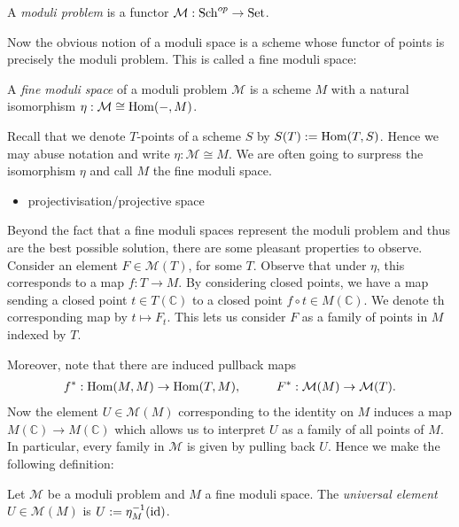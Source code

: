\documentclass[12pt]{ociamthesis}  %
\begin{document}
\begin{definition}
  A \emph{moduli problem} is a functor $\mathcal M:\operatorname{Sch}^{op}\to\operatorname{Set}$.
\end{definition}

Now the obvious notion of a moduli space is a scheme whose functor
of points is precisely the moduli problem. This is called a fine
moduli space:

\begin{definition}
  A \emph{fine moduli space} of a moduli problem $\mathcal M$
  is a scheme $M$ with a natural isomorphism
  $\eta : \mathcal M \cong \operatorname{Hom}(-,M)$.
\end{definition}

Recall that we denote $T$-points of a scheme $S$ by
$S(T) := \operatorname{Hom}(T,S)$. Hence we may abuse notation and write
$\eta : \mathcal M \cong M$. We are often going to surpress the
isomorphism $\eta$ and call $M$ the fine moduli space.

\begin{example}
  \begin{itemize}
    \item projectivisation/projective space \missingexample
  \end{itemize}
\end{example}

Beyond the fact that a fine moduli spaces represent the moduli
problem and thus are the best possible solution, there are some
pleasant properties to observe.
Consider an element $F\in\mathcal M(T)$, for some $T$. Observe that
under $\eta$, this corresponds to a map $f:T\to M$. By considering
closed points, we have a map sending a closed point $t\in T(\mathbb C)$
to a closed point $f\circ t\in M(\mathbb C)$. We denote th corresponding
map by $t \mapsto F_t$. This lets us consider $F$ as a family of
points in $M$ indexed by $T$.

Moreover, note that there are induced
pullback maps
\begin{align*}
  f^* : \operatorname{Hom}(M,M)\to\operatorname{Hom}(T,M), \hspace{1cm}
  F^* : \mathcal M(M)\to \mathcal M(T).
\end{align*}
Now the element $U\in\mathcal M(M)$ corresponding to the identity on $M$
induces a map $M(\mathbb C)\to M(\mathbb C)$ which allows us to
interpret $U$ as a family of all points of $M$. In particular,
every family in $\mathcal M$ is given by pulling back $U$.
Hence we make the following definition:

\begin{definition}
  Let $\mathcal M$ be a moduli problem and $M$ a fine moduli space.
  The \emph{universal element} $U\in\mathcal M(M)$ is
  $U:=\eta^{-1}_M (\operatorname{id})$.
\end{definition}
\end{document}
